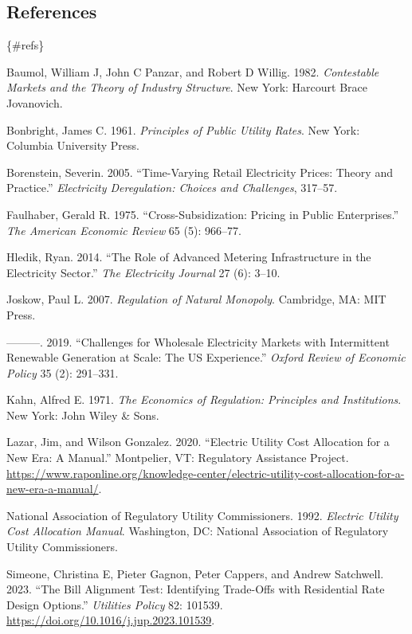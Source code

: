 \documentclass[
  11pt,
]{article}
\newlength{\cslhangindent}
\newenvironment{CSLReferences}[2] %
 {\begin{list}{}{%
  \setlength{\itemindent}{0pt}
  \setlength{\leftmargin}{0pt}
  \setlength{\parsep}{0pt}
  \ifodd #1
   \setlength{\leftmargin}{\cslhangindent}
   \setlength{\itemindent}{-1\cslhangindent}
  \fi
  \setlength{\itemsep}{#2\baselineskip}}}
 {\end{list}}
\begin{document}
\subsection{References}\label{references}

\{\#refs\}

\label{refs}
\begin{CSLReferences}{1}{0}
Baumol, William J, John C Panzar, and Robert D Willig. 1982.
\emph{Contestable Markets and the Theory of Industry Structure}. New
York: Harcourt Brace Jovanovich.

Bonbright, James C. 1961. \emph{Principles of Public Utility Rates}. New
York: Columbia University Press.

Borenstein, Severin. 2005. {``Time-Varying Retail Electricity Prices:
Theory and Practice.''} \emph{Electricity Deregulation: Choices and
Challenges}, 317--57.

Faulhaber, Gerald R. 1975. {``Cross-Subsidization: Pricing in Public
Enterprises.''} \emph{The American Economic Review} 65 (5): 966--77.

Hledik, Ryan. 2014. {``The Role of Advanced Metering Infrastructure in
the Electricity Sector.''} \emph{The Electricity Journal} 27 (6): 3--10.

Joskow, Paul L. 2007. \emph{Regulation of Natural Monopoly}. Cambridge,
MA: MIT Press.

---------. 2019. {``Challenges for Wholesale Electricity Markets with
Intermittent Renewable Generation at Scale: The US Experience.''}
\emph{Oxford Review of Economic Policy} 35 (2): 291--331.

Kahn, Alfred E. 1971. \emph{The Economics of Regulation: Principles and
Institutions}. New York: John Wiley \& Sons.

Lazar, Jim, and Wilson Gonzalez. 2020. {``Electric Utility Cost
Allocation for a New Era: A Manual.''} Montpelier, VT: Regulatory
Assistance Project.
\url{https://www.raponline.org/knowledge-center/electric-utility-cost-allocation-for-a-new-era-a-manual/}.

National Association of Regulatory Utility Commissioners. 1992.
\emph{Electric Utility Cost Allocation Manual}. Washington, DC: National
Association of Regulatory Utility Commissioners.

Simeone, Christina E, Pieter Gagnon, Peter Cappers, and Andrew
Satchwell. 2023. {``The Bill Alignment Test: Identifying Trade-Offs with
Residential Rate Design Options.''} \emph{Utilities Policy} 82: 101539.
\url{https://doi.org/10.1016/j.jup.2023.101539}.

\end{CSLReferences}
\end{document}
